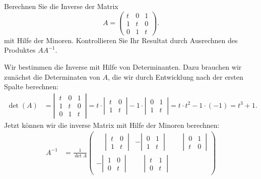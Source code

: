 Berechnen Sie die Inverse der Matrix
\[
A
=
\begin{pmatrix}
t&0&1\\
1&t&0\\
0&1&t
\end{pmatrix}.
\]
mit Hilfe der Minoren. Kontrollieren Sie Ihr Resultat durch Ausrechnen des Produktes $AA^{-1}$.


\begin{loesung}
Wir bestimmen die Inverse mit Hilfe von Determinanten.
Dazu brauchen wir zunächst die Determinaten von $A$, die wir durch Entwicklung
nach der ersten Spalte berechnen:
\begin{align*}
\det(A)
&=
\left|\,\begin{matrix}
t&0&1\\
1&t&0\\
0&1&t
\end{matrix}\,\right|
=
t\cdot\left|\,\begin{matrix}t&0\\1&t\end{matrix}\,\right|
-1\cdot\left|\,\begin{matrix}0&1\\1&t\end{matrix}\,\right|
=
t\cdot t^2-1\cdot(-1)=t^3+1.
\end{align*}
Jetzt können wir die inverse Matrix mit Hilfe der Minoren berechnen:
\begin{align}
A^{-1}
&=
\frac1{\det{A}}\begin{pmatrix}
\phantom{-}\left|\,\begin{matrix}t&0\\1&t\end{matrix}\,\right|
	&-\left|\,\begin{matrix}0&1\\1&t\end{matrix}\,\right|
		&\phantom{-}\left|\,\begin{matrix}0&1\\t&0\end{matrix}\,\right|
			\\[11pt]
-\left|\,\begin{matrix}1&0\\0&t\end{matrix}\,\right|
	&\phantom{-}\left|\,\begin{matrix}t&1\\0&t\end{matrix}\,\right|

\end{pmatrix}
\end{align}
\end{loesung}
